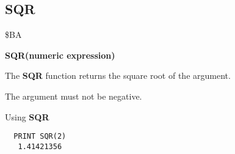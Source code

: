 \subsection{SQR}
\begin{description}[leftmargin=2cm,style=nextline]
\item [Token:] \$BA
\item [Format:] {\bf SQR(numeric expression)}
\item [Usage:] The {\bf SQR} function returns the square root
               of the argument.

\item [Remarks:] The argument must not be negative.
\item [Example:] Using {\bf SQR}
\begin{tcolorbox}[colback=black,coltext=white]
\verbatimfont{\codefont}
\begin{verbatim}
  PRINT SQR(2)
   1.41421356
\end{verbatim}
\end{tcolorbox}
\end{description}


\newpage
